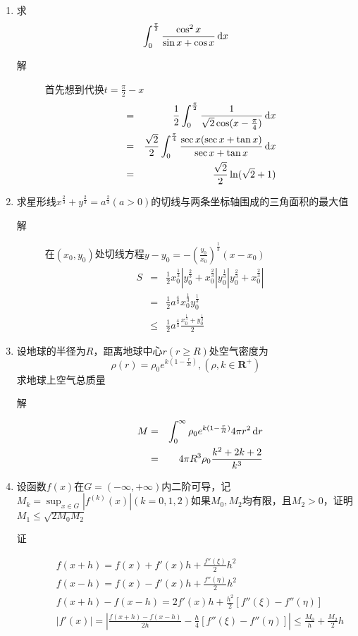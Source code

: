 \begin{enumerate}
\item 求
\[
\int_0^{\frac{\pi}{2}} \frac{\cos^2x}{\sin x+\cos x}\,\mathrm{d} x
\]
\begin{description}
\item[解] 首先想到代换$t=\frac{\pi}{2}-x$
\begin{eqnarray*}
& = & \frac{1}{2}\int_0^{\frac{\pi}{2}} \frac{1}{\sqrt{2}\cos(x-\frac{\pi}{4})}\,\mathrm{d} x\\
& = & \frac{\sqrt{2}}{2} \int_0^{\frac{\pi}{4}} \frac{\sec x(\sec x+\tan x)}{\sec x+\tan x} \,\mathrm{d} x \\
& = & \frac{\sqrt{2}}{2} \ln(\sqrt{2}+1)
\end{eqnarray*}
\end{description}

\item 求星形线$x^{\frac{2}{3}}+y^{\frac{2}{3}}=a^{\frac{2}{3}}(a>0)$的切线与两条坐标轴围成的三角面积的最大值
\begin{description}
\item[解] 在$(x_0,y_0)$处切线方程$y-y_0=-(\frac{y_0}{x_0})^\frac{1}{3}(x-x_0)$
\begin{eqnarray*}
S & = & \frac{1}{2} x_0^{\frac{1}{3}}|y_0^\frac{2}{3}+x_0^\frac{2}{3}| y_0^{\frac{1}{3}}|y_0^\frac{2}{3}+x_0^\frac{2}{3}| \\
& = & \frac{1}{2} a^{\frac{4}{3}}x_0^{\frac{1}{3}}y_0^{\frac{1}{3}}\\
& \leq & \frac{1}{2} a^{\frac{4}{3}}\frac{x_0^{\frac{1}{3}}+y_0^{\frac{1}{3}}}{2}
\end{eqnarray*}
\end{description}

\item 设地球的半径为$R$，距离地球中心$r(r\geq R)$处空气密度为
\[
\rho(r)=\rho_0e^{k(1-\frac{r}{R})},(\rho,k\in \mathbf{R}^+)
\]
求地球上空气总质量
\begin{description}
\item[解]
\begin{eqnarray*}
M & = & \int_0^\infty \rho_0 e^{k(1-\frac{r}{R})}4\pi r^2 \,\mathrm{d} r \\
& = & 4\pi R^3\rho_0\frac{k^2+2k+2}{k^3}
\end{eqnarray*}
\end{description}

\item 设函数$f(x)$在$G=(-\infty,+\infty)$内二阶可导，记$M_k=\sup_{x\in G}|f^{(k)}(x)|(k=0,1,2)$如果$M_0,M_2$均有限，且$M_2>0$，证明$M_1\leq \sqrt{2M_0M_2}$
\begin{description}
\item[证]
\begin{eqnarray*}
f(x+h) = f(x)+f'(x)h+\frac{f''(\xi)}{2}h^2 \\
f(x-h) = f(x)-f'(x)h+\frac{f''(\eta)}{2}h^2 \\
f(x+h) - f(x-h) = 2f'(x)h+\frac{h^2}{2}[f''(\xi)-f''(\eta)] \\
|f'(x)| = \left|\frac{f(x+h)-f(x-h)}{2h}-\frac{h}{4}[f''(\xi)-f''(\eta)]\right| \leq \frac{M_0}{h}+\frac{M_2}{2}h
\end{eqnarray*}
\end{description}


\end{enumerate}
